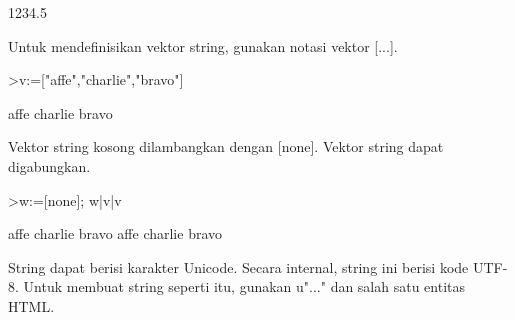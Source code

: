 \documentclass[a4paper,10pt]{article}
\begin{document}
\begin{eulernotebook}
\begin{euleroutput}
  1234.5
\end{euleroutput}
\begin{eulercomment}
Untuk mendefinisikan vektor string, gunakan notasi vektor [...].
\end{eulercomment}
\begin{eulerprompt}
>v:=["affe","charlie","bravo"]
\end{eulerprompt}
\begin{euleroutput}
  affe
  charlie
  bravo
\end{euleroutput}
\begin{eulercomment}
Vektor string kosong dilambangkan dengan [none]. Vektor string dapat
digabungkan.
\end{eulercomment}
\begin{eulerprompt}
>w:=[none]; w|v|v
\end{eulerprompt}
\begin{euleroutput}
  affe
  charlie
  bravo
  affe
  charlie
  bravo
\end{euleroutput}
\begin{eulercomment}
String dapat berisi karakter Unicode. Secara internal, string ini
berisi kode UTF-8. Untuk membuat string seperti itu, gunakan u"..."
dan salah satu entitas HTML.


\end{eulercomment}
\end{eulernotebook}
\end{document}
